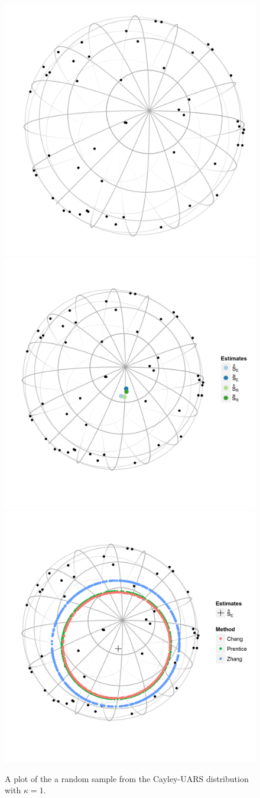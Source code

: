 \begin{figure}
\centering
\includegraphics[width=.6\textwidth]{figures/eye1}
\includegraphics[width=.75\textwidth]{figures/eye2}
\includegraphics[width=.75\textwidth]{figures/eye3}
\caption{\label{figure:eye1}
A plot of the a random sample from the Cayley-UARS distribution with $\kappa=1$.}
\end{figure}

